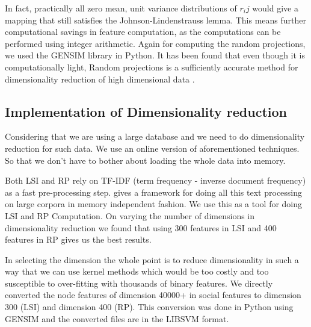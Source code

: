 In fact, practically all zero mean, unit variance distributions of $r_ij$ would give a mapping that still satisfies the Johnson-Lindenstrauss
lemma. This means further computational savings in feature computation, as the computations can be performed using integer arithmetic. 
Again for computing the random projections, we used the GENSIM library \citep{gensim} in Python. It has been found that even though it is computationally light, Random projections is a sufficiently accurate method for dimensionality reduction of high dimensional data \citet*{Dasgupta}.

\subsection{Implementation of Dimensionality reduction}
Considering that we are using a large database and we need to do dimensionality reduction for such data. We use an online version 
of aforementioned techniques. So that we don't have to bother about loading the whole data into memory. 

Both LSI and RP rely on TF-IDF (term frequency - inverse document frequency) as a fast pre-processing step.  \citet*{radimrehurek} gives a framework \citet*{gensim} for doing all this text processing on large corpora in memory independent fashion. 
We use this as a tool for doing LSI and RP Computation. On varying the number of dimensions in dimensionality reduction we found that 
using 300 features in LSI and 400 features in RP gives us the best results.

In selecting the dimension the whole point is to reduce dimensionality in such a way that we can use kernel methods which would 
be too costly and too susceptible to over-fitting with thousands of binary features. We directly converted the node features of dimension 40000+ in social features to dimension 300 (LSI) and dimension 400 (RP).  This conversion was done in Python using GENSIM and the converted files are in the LIBSVM format. 
